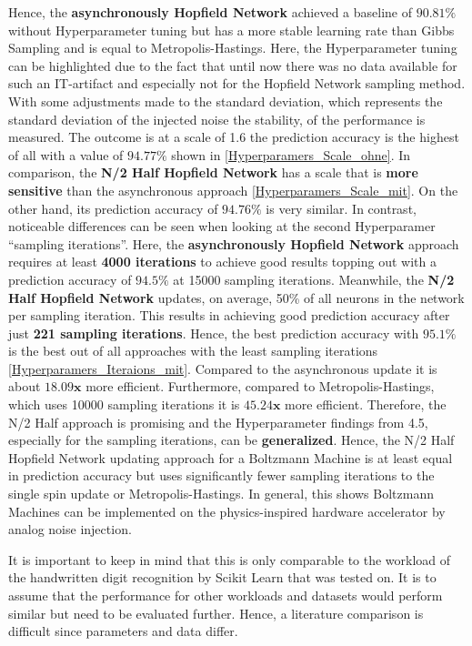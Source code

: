 Hence, the \textbf{asynchronously Hopfield Network} achieved a baseline of \(\mathbf{90.81\%}\) without Hyperparameter tuning but has a more stable  learning rate than Gibbs Sampling and
is equal to Metropolis-Hastings.
Here, the Hyperparameter tuning can be highlighted due to the fact that until now there was no data available for such an \ac{IT}-artifact and especially not for the Hopfield Network sampling method.
With some adjustments made to the standard deviation, which represents the standard deviation of the injected noise the stability, of the performance is measured.
The outcome is at a scale of 1.6 the prediction accuracy is the highest of all with a value of \(\mathbf{94.77\%}\) shown in \ref{Hyperparamers_Scale_ohne}.
In comparison, the \textbf{N/2 Half Hopfield Network} has a scale that is \textbf{more sensitive} than the asynchronous approach \ref{Hyperparamers_Scale_mit}.
On the other hand, its prediction accuracy of \(\mathbf{94.76\%}\) is very similar.
In contrast, noticeable differences can be seen when looking at the second Hyperparamer ``sampling iterations''. 
Here, the \textbf{asynchronously Hopfield Network} approach requires at least \textbf{4000 iterations} to achieve good results topping out with
a prediction accuracy of \(\mathbf{94.5\%}\) at 15000 sampling iterations. 
Meanwhile, the \textbf{N/2 Half Hopfield Network} updates, on average, 50\% of all neurons in the network per sampling iteration.
This results in achieving good prediction accuracy after just \textbf{221 sampling iterations}.
Hence, the best prediction accuracy with \(\mathbf{95.1\%}\) is the best out of all approaches with the least sampling iterations \ref{Hyperparamers_Iteraions_mit}.
Compared to the asynchronous update it is about \(\mathbf{18.09x}\) more efficient. 
Furthermore, compared to Metropolis-Hastings, which uses 10000 sampling iterations it is \(\mathbf{45.24x}\) more efficient.
Therefore, the N/2 Half approach is promising and the Hyperparameter findings from 4.5, especially for the sampling iterations, can be \textbf{generalized}.
Hence, the N/2 Half Hopfield Network updating approach for a Boltzmann Machine is at least equal in prediction accuracy but uses significantly fewer sampling iterations to the single spin update or Metropolis-Hastings.
In general, this shows Boltzmann Machines can be implemented on the physics-inspired hardware accelerator by analog noise injection. 

It is important to keep in mind that this is only comparable to the workload of the handwritten digit recognition by Scikit Learn that was tested on. 
It is to assume that the performance for other workloads and datasets would perform similar but need to be evaluated further. 
Hence, a literature comparison is difficult since parameters and data differ. 

